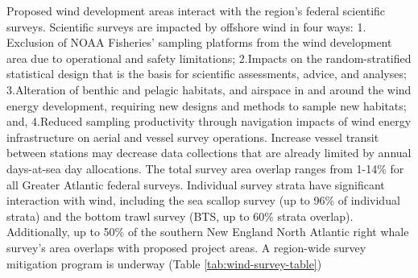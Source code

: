 \documentclass[
  10pt,
]{article}
\let\origtable\table
\let\endorigtable\endtable
\renewenvironment{table}[1][2] {
    \expandafter\origtable\expandafter[H]
} {
    \endorigtable
}
\begin{document}
Proposed wind development areas interact with the region's federal
scientific surveys. Scientific surveys are impacted by offshore wind in
four ways: 1. Exclusion of NOAA Fisheries' sampling platforms from the
wind development area due to operational and safety limitations;
2.Impacts on the random-stratified statistical design that is the basis
for scientific assessments, advice, and analyses; 3.Alteration of
benthic and pelagic habitats, and airspace in and around the wind energy
development, requiring new designs and methods to sample new habitats;
and, 4.Reduced sampling productivity through navigation impacts of wind
energy infrastructure on aerial and vessel survey operations. Increase
vessel transit between stations may decrease data collections that are
already limited by annual days-at-sea day allocations. The total survey
area overlap ranges from 1-14\% for all Greater Atlantic federal
surveys. Individual survey strata have significant interaction with
wind, including the sea scallop survey (up to 96\% of individual strata)
and the bottom trawl survey (BTS, up to 60\% strata overlap).
Additionally, up to 50\% of the southern New England North Atlantic
right whale survey's area overlaps with proposed project areas. A
region-wide survey mitigation program is underway (Table
\ref{tab:wind-survey-table})

\begin{table}

\caption{\label{tab:wind-survey-table}Survey mitigation planning.}
\centering
{}
\end{table}
\end{document}

